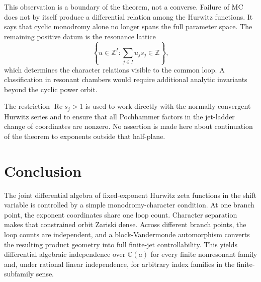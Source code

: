 \documentclass[11pt,reqno]{amsart}
\theoremstyle{definition}
\theoremstyle{remark}
\newcommand{\C}{\mathbb C}
\newcommand{\Z}{\mathbb Z}
\newcommand{\mc}{\mathrm{MC}}
\begin{document}
This observation is a boundary of the theorem, not a converse.  Failure of
$\mc$ does not by itself produce a differential relation among the Hurwitz
functions.  It says that cyclic monodromy alone no longer spans the full
parameter space.  The remaining positive datum is the resonance lattice
\[
  \left\{u\in\Z^I:\sum_{j\in I}u_js_j\in\Z\right\},
\]
which determines the character relations visible to the common loop.  A
classification in resonant chambers would require additional analytic
invariants beyond the cyclic power orbit.

The restriction $\operatorname{Re}s_j>1$ is used to work directly with the
normally convergent Hurwitz series and to ensure that all Pochhammer factors
in the jet-ladder change of coordinates are nonzero.  No assertion is made
here about continuation of the theorem to exponents outside that half-plane.

\section{Conclusion}

The joint differential algebra of fixed-exponent Hurwitz zeta functions in
the shift variable is controlled by a simple monodromy-character condition.
At one branch point, the exponent coordinates share one loop count.  Character
separation makes that constrained orbit Zariski dense.  Across different
branch points, the loop counts are independent, and a block-Vandermonde
automorphism converts the resulting product geometry into full finite-jet
controllability.  This yields differential algebraic independence over
$\C(a)$ for every finite nonresonant family and, under rational linear
independence, for arbitrary index families in the finite-subfamily sense.
\end{document}
